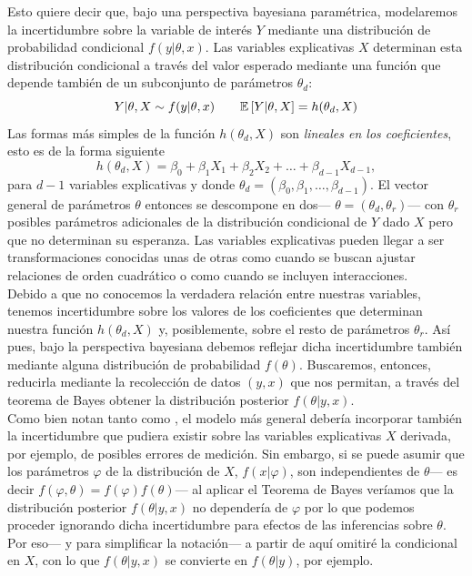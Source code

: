 Esto quiere decir que, bajo una perspectiva bayesiana paramétrica, modelaremos la incertidumbre sobre la variable de interés $Y$ mediante una distribución de probabilidad condicional $f(y|\theta,x)$. Las variables explicativas $X$ determinan esta distribución condicional a través del valor esperado mediante una función que depende también de un subconjunto de parámetros $\theta_d$: 
\begin{equation} \label{eq:regr_gral}
Y|\theta,X \sim f(y|\theta,x) \qquad \mathbb{E}\left[ Y|\theta,X \right] = h(\theta_d,X)
\end{equation} 
Las formas más simples de la función $h(\theta_d,X)$ son \textit{lineales en los coeficientes}, esto es de la forma siguiente 
\begin{equation*}
h(\theta_d,X) = \beta_0 + \beta_1X_1 + \beta_2X_2 + \dots + \beta_{d-1}X_{d-1}, 
\end{equation*}
para $d-1$ variables explicativas y donde $\theta_d = (\beta_0,\beta_1,\dots,\beta_{d-1})$. El vector general de parámetros $\theta$ entonces se descompone en dos--- $\theta = (\theta_d,\theta_r)$--- con $\theta_r$ posibles parámetros adicionales de la distribución condicional de $Y$ dado $X$ pero que no determinan su esperanza. Las variables explicativas pueden llegar a ser transformaciones conocidas unas de otras como cuando se buscan ajustar relaciones de orden cuadrático o como cuando se incluyen interacciones.\\

Debido a que no conocemos la verdadera relación entre nuestras variables, tenemos incertidumbre sobre los valores de los coeficientes que determinan nuestra función $h(\theta_d ,X)$ y, posiblemente, sobre el resto de parámetros $\theta_r$. Así pues, bajo la perspectiva bayesiana debemos reflejar dicha incertidumbre también mediante alguna distribución de probabilidad $f(\theta)$. Buscaremos, entonces, reducirla mediante la recolección de datos $(y,x)$ que nos permitan, a través del teorema de Bayes obtener la distribución posterior $f(\theta|y,x)$.\\

Como bien notan tanto \textcite{Gelman13} como \textcite{Congdon06}, el modelo más general debería incorporar también la incertidumbre que pudiera existir sobre las variables explicativas $X$ derivada, por ejemplo, de posibles errores de medición. Sin embargo, si se puede asumir que los parámetros $\varphi$ de la distribución de $X$, $f(x|\varphi)$, son independientes de $\theta$--- es decir $f(\varphi,\theta)=f(\varphi)f(\theta)$--- al aplicar el Teorema de Bayes veríamos que la distribución posterior $f(\theta|y,x)$ no dependería de $\varphi$ por lo que podemos proceder ignorando dicha incertidumbre para efectos de las inferencias sobre $\theta$. Por eso--- y para simplificar la notación--- a partir de aquí omitiré la condicional en $X$, con lo que $f(\theta|y,x)$ se convierte en $f(\theta|y)$, por ejemplo. \\

